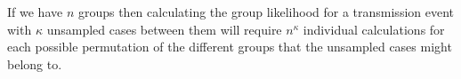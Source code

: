 \documentclass[11pt,a4paper]{report}
\begin{document}
If we have $n$ groups then calculating the group likelihood for a transmission event with $\kappa$ unsampled cases between them will require $n^\kappa$ individual calculations for each possible permutation of the different groups that the unsampled cases might belong to.




\end{document}
